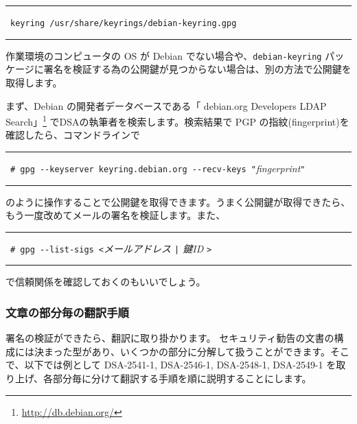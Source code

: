\documentclass[mingoth,a4paper]{jsarticle}
\begin{document}
\hfil\begin{minipage}{0.9\linewidth}
\vspace*{1em}
\hrule
\vrule height1.7em depth 1em
\hfil{\ \verb+keyring /usr/share/keyrings/debian-keyring.gpg+
}\hfill\vrule height1.7em depth 1em
\hrule
\vspace*{1em}
\end{minipage}\hfil


作業環境のコンピュータの OS が Debian でない場合や、\texttt{debian-keyring} パッケージに署名を検証する為の公開鍵が見つからない場合は、別の方法で公開鍵を取得します。

まず、Debian の開発者データベースである「 debian.org Developers LDAP Search」\footnote{\url{http://db.debian.org/}} でDSAの執筆者を検索します。検索結果で PGP の指紋(fingerprint)を確認したら、コマンドラインで

\hfil\begin{minipage}{0.9\linewidth}
\vspace*{1em}
\hrule
\vrule height1.7em depth 1em
\hfil{\ \verb+# gpg --keyserver keyring.debian.org --recv-keys "+{\it fingerprint}\verb+"+
}\hfill\vrule height1.7em depth 1em
\hrule
\vspace*{1em}
\end{minipage}\hfil

のように操作することで公開鍵を取得できます。うまく公開鍵が取得できたら、もう一度改めてメールの署名を検証します。また、

\hfil\begin{minipage}{0.9\linewidth}
\vspace*{1em}
\hrule
\vrule height1.7em depth 1em
\hfil{\ \verb+# gpg --list-sigs <+{\it メールアドレス \verb+|+ 鍵ID }\verb+>+
}\hfill\vrule height1.7em depth 1em
\hrule
\vspace*{1em}
\end{minipage}\hfil

で信頼関係を確認しておくのもいいでしょう。


\subsubsection{文章の部分毎の翻訳手順}

署名の検証ができたら、翻訳に取り掛かります。
セキュリティ勧告の文書の構成には決まった型があり、いくつかの部分に分解して扱うことができます。そこで、以下では例として DSA-2541-1, DSA-2546-1, DSA-2548-1, DSA-2549-1 を取り上げ、各部分毎に分けて翻訳する手順を順に説明することにします。
\end{document}
